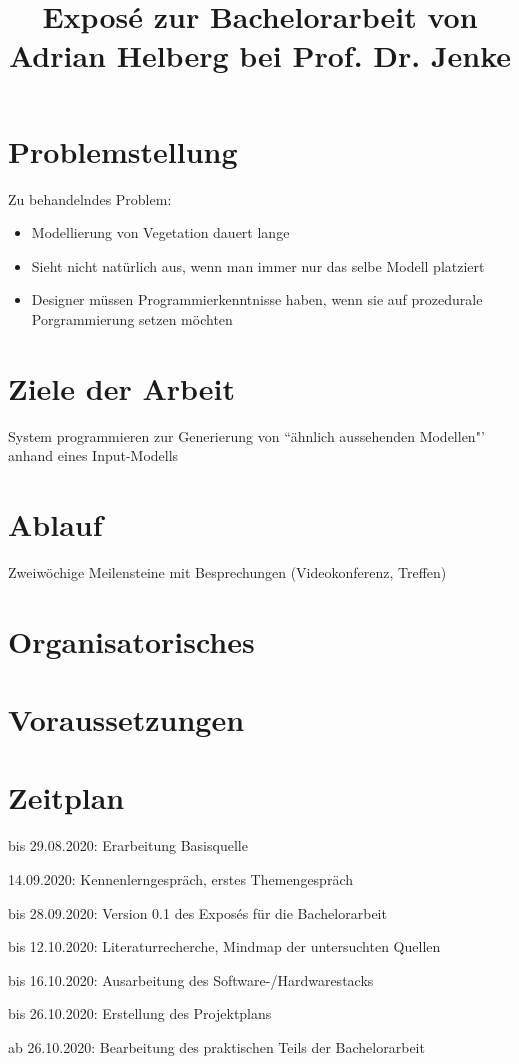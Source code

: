 \documentclass[11pt]{article}
\title{\textbf{Exposé} zur Bachelorarbeit von Adrian Helberg bei Prof. Dr. Jenke}
\newcommand{\cmark}{\ding{51}}%
\newcommand{\done}{\rlap{$\square$}{\raisebox{2pt}{\large\hspace{1pt}\cmark}}%
\hspace{-2.5pt}}
\begin{document}
    \maketitle

    \section{Problemstellung}
    Zu behandelndes Problem:
    \begin{itemize}
        \item Modellierung von Vegetation dauert lange
        \item Sieht nicht natürlich aus, wenn man immer nur das selbe Modell platziert
        \item Designer müssen Programmierkenntnisse haben, wenn sie auf prozedurale Porgrammierung setzen möchten
    \end{itemize}

    \section{Ziele der Arbeit}
    System programmieren zur Generierung von ``ähnlich aussehenden Modellen"' anhand eines Input-Modells

    \section{Ablauf}
    Zweiwöchige Meilensteine mit Besprechungen (Videokonferenz, Treffen)

    \section{Organisatorisches}
    \section{Voraussetzungen}

    \newpage

    \section{Zeitplan}
    \begin{todolist}
        \item[\done] bis 29.08.2020: Erarbeitung Basisquelle \cite{basisquelle}
        \item[\done] 14.09.2020: Kennenlerngespräch, erstes Themengespräch
        \item bis 28.09.2020: Version 0.1 des Exposés für die Bachelorarbeit
        \item bis 12.10.2020: Literaturrecherche, Mindmap der untersuchten Quellen
        \item bis 16.10.2020: Ausarbeitung des Software-/Hardwarestacks
        \item bis 26.10.2020: Erstellung des Projektplans
        \item ab 26.10.2020: Bearbeitung des praktischen Teils der Bachelorarbeit
    \end{todolist}

    ~\nocite{*}
    
    
\end{document}
